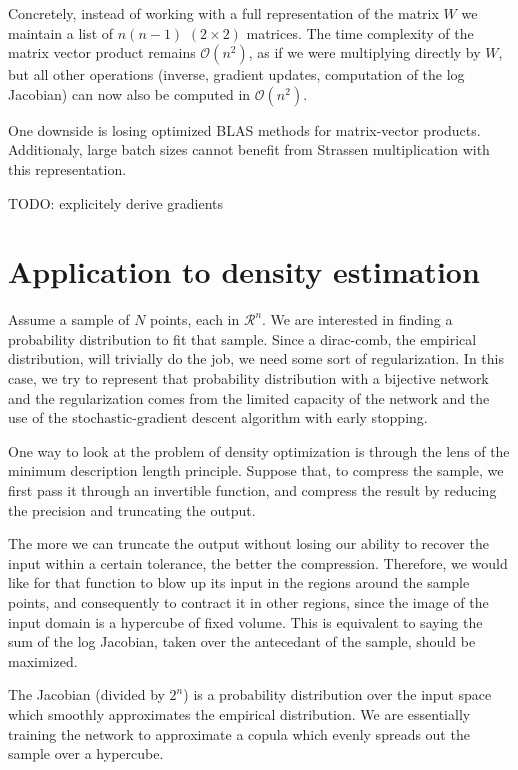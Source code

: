 \documentclass{article}
\begin{document}
Concretely, instead of working with a full representation of the matrix \(W\) we
maintain a list of \(n(n-1)\) \((2 \times 2)\) matrices. The time complexity of
the matrix vector product remains \(\mathcal{O}(n^2)\), as if we were
multiplying directly by \(W\), but all other operations
(inverse, gradient updates, computation of the log Jacobian) can now
also be computed in \(\mathcal{O}(n^2)\).

One downside is losing optimized BLAS methods for matrix-vector products.
Additionaly, large batch sizes cannot benefit from Strassen multiplication
with this representation.


TODO: explicitely derive gradients

\section{Application to density estimation}

Assume a sample of \(N\) points, each in \(\mathcal{R}^n\). We are interested in
finding a probability distribution to fit that sample. Since a dirac-comb,
the empirical distribution, will trivially do the job, we need some sort of
regularization. In this case, we try to represent that probability distribution
with a bijective network and the regularization comes from the limited
capacity of the network and the use of the stochastic-gradient descent
algorithm with early stopping.

One way to look at the problem of density optimization is through the lens of
the minimum description length principle. Suppose that, to compress the
sample, we first pass it through an invertible function, and compress the
result by reducing the precision and truncating the output.

The more we can truncate the output without losing our ability to recover the
input within a certain tolerance, the better the compression.
Therefore, we would like for that function to blow up its input in the
regions around the sample points, and consequently to contract it in other
regions, since the image of the input domain is a hypercube of fixed volume.
This is equivalent to saying the sum of the log Jacobian, taken over the
antecedant of the sample, should be maximized.

The Jacobian (divided by \(2^n\)) is a probability distribution
over the input space which smoothly approximates the empirical distribution.
We are essentially training the network to approximate a copula which evenly
spreads out the sample over a hypercube.
\end{document}
